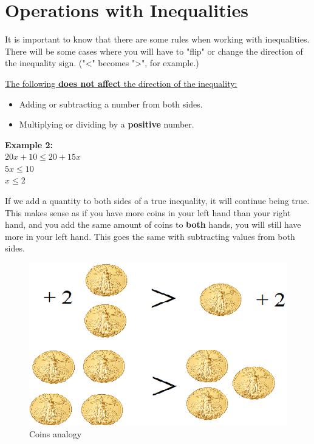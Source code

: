 \documentclass[12pt,fleqn]{book} %
\begin{document}

\section{Operations with Inequalities}
It is important to know that there are some rules when working with inequalities. There will be some cases where you will have to "flip" or change the direction of the inequality sign. ("<" becomes ">", for example.)

\begin{center}
\noindent \underline{The following \textbf{does not affect} the direction of the inequality:}
\begin{multicols}{2}
\begin{itemize}
    \item Adding or subtracting a number from both sides.
    \item Multiplying or dividing by a \textbf{positive} number.
\end{itemize}
\columnbreak
\textbf{Example 2:}\\
$20x+10\leq20+15x$\\
$5x\leq10$\\
$x\leq2$\\
\end{multicols}
\end{center}

\noindent If we add a quantity to both sides of a true inequality, it will continue being true. This makes sense as if you have more coins in your left hand than your right hand, and you add the same amount of coins to \textbf{both} hands, you will still have more in your left hand. This goes the same with subtracting values from both sides.\\

\vspace*{-3mm}

\begin{figure}[h]
\centering\includegraphics[scale=0.5]{Pictures/Coins.jpg}
\caption{Coins analogy}
\end{figure}
\end{document}
